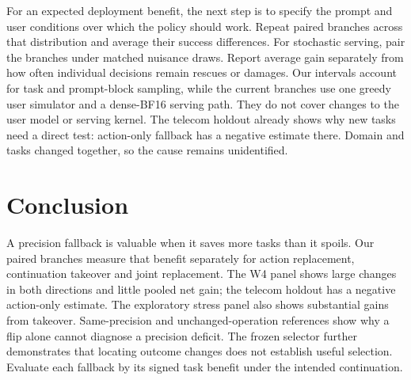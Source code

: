 For an expected deployment benefit, the next step is to specify the prompt and user conditions over which the policy should work. Repeat paired branches across that distribution and average their success differences. For stochastic serving, pair the branches under matched nuisance draws. Report average gain separately from how often individual decisions remain rescues or damages. Our intervals account for task and prompt-block sampling, while the current branches use one greedy user simulator and a dense-BF16 serving path. They do not cover changes to the user model or serving kernel. The telecom holdout already shows why new tasks need a direct test: action-only fallback has a negative estimate there. Domain and tasks changed together, so the cause remains unidentified.
\label{sec:scope}

\section{Conclusion}
\label{sec:conclusion}

A precision fallback is valuable when it saves more tasks than it spoils. Our paired branches measure that benefit separately for action replacement, continuation takeover and joint replacement. The W4 panel shows large changes in both directions and little pooled net gain; the telecom holdout has a negative action-only estimate. The exploratory stress panel also shows substantial gains from takeover. Same-precision and unchanged-operation references show why a flip alone cannot diagnose a precision deficit. The frozen selector further demonstrates that locating outcome changes does not establish useful selection. Evaluate each fallback by its signed task benefit under the intended continuation.
